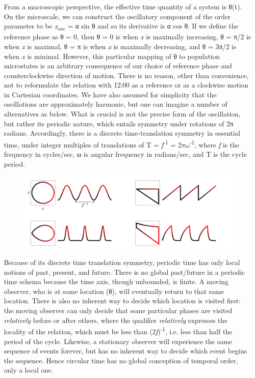  From a macroscopic perspective, the effective time quantity of a system is θ(t). On the microscale, we can construct the oscillatory component of the order parameter to be \textit{x}\textsubscript{osc} = α sin θ and so its derivative is α cos θ. If we define the reference phase as θ = 0, then θ = 0 is when \textit{x} is maximally increasing, θ = π/2 is when \textit{x} is maximal, θ = π is when \textit{x} is maximally decreasing, and θ = 3π/2 is when \textit{x} is minimal. However, this particular mapping of θ to population microstates is an arbitrary consequence of our choice of reference phase and counterclockwise direction of motion. There is no reason, other than convenience, not to reformulate the relation with 12:00 as a reference or as a clockwise motion in Cartesian coordinates. We have also assumed for simplicity that the oscillations are approximately harmonic, but one can imagine a number of alternatives as below. What is crucial is not the precise form of the oscillation, but rather its periodic nature, which entails symmetry under rotations of 2π radians. Accordingly, there is a discrete time-translation symmetry in essential time, under integer multiples of translations of T = \textit{f}\textsuperscript{{}-1} = 2$\pi \omega $\textsuperscript{{}-1}, where \textit{f} is the frequency in cycles/sec, ω is angular frequency in radians/sec, and T is the cycle period.

  
\begin{figure}
\includegraphics[width=\textwidth]{figures/Tilsen-img47.png}
\caption{\missingcaption}
\label{fig:3:19}
\end{figure}
 

  Because of its discrete time translation symmetry, periodic time has only local notions of past, present, and future. There is no global past/future in a periodic time schema because the time axis, though unbounded, is finite. A moving observer, who is at some location (θ), will eventually return to that same location. There is also no inherent way to decide which location is visited first: the moving observer can only decide that some particular phases are visited \textit{relatively} before or after others, where the qualifier \textit{relatively} expresses the locality of the relation, which must be less than (2\textit{f})\textsuperscript{{}-1}, i.e. less than half the period of the cycle. Likewise, a stationary observer will experience the same sequence of events forever, but has no inherent way to decide which event begins the sequence. Hence circular time has no global conception of temporal order, only a local one. 

